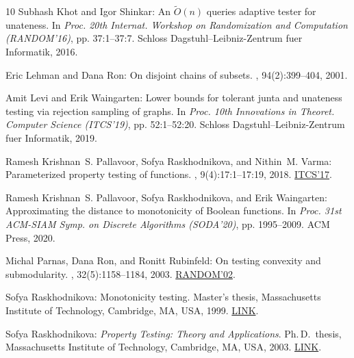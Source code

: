 \documentclass[11pt]{article}
\numberwithin{equation}{section}
\theoremstyle{definition}
\theoremstyle{plain}
\begin{document}
\begin{thebibliography}{10}
{\sc Subhash Khot and Igor Shinkar}: An $\widetilde{O}(n)$ queries adaptive
  tester for unateness.
\newblock In {\em Proc. 20th Internat. Workshop on Randomization and
  Computation (RANDOM'16)}, pp. 37:1--37:7. Schloss Dagstuhl--Leibniz-Zentrum
  fuer Informatik, 2016.

{\sc Eric Lehman and Dana Ron}: On disjoint chains of subsets.
, 94(2):399--404, 2001.

{\sc Amit Levi and Erik Waingarten}: Lower bounds for tolerant junta and
  unateness testing via rejection sampling of graphs.
\newblock In {\em Proc. 10th Innovations in Theoret. Computer Science
  (ITCS'19)}, pp. 52:1--52:20. Schloss Dagstuhl--Leibniz-Zentrum fuer
  Informatik, 2019.

{\sc Ramesh Krishnan~S. Pallavoor, Sofya Raskhodnikova, and Nithin~M. Varma}:
  Parameterized property testing of functions.
, 9(4):17:1--17:19, 2018.
\newblock \prelim \href{https://doi.org/10.4230/LIPIcs.ITCS.2017.12}{ITCS'17}.
\newblock [\epfmtdoi{10.1145/3155296}]

{\sc Ramesh Krishnan~S. Pallavoor, Sofya Raskhodnikova, and Erik Waingarten}:
  Approximating the distance to monotonicity of {Boolean} functions.
\newblock In {\em Proc. 31st ACM-SIAM Symp. on Discrete Algorithms (SODA'20)},
  pp. 1995--2009. ACM Press, 2020.

{\sc Michal Parnas, Dana Ron, and Ronitt Rubinfeld}: On testing convexity and
  submodularity.
, 32(5):1158--1184, 2003.
\newblock \prelim \href{https://doi.org/10.1007/3-540-45726-7\_2}{RANDOM'02}.
\newblock [\epfmtdoi{10.1137/S0097539702414026}]

{\sc Sofya Raskhodnikova}: Monotonicity testing.
\newblock Master's thesis, Massachusetts Institute of Technology, Cambridge,
  MA, {USA}, 1999.
\newblock \href{https://dspace.mit.edu/handle/1721.1/80562}{LINK}.

{\sc Sofya Raskhodnikova}: {\em Property Testing: Theory and Applications}.
\newblock Ph.\,D.\ thesis, Massachusetts Institute of Technology, Cambridge,
  MA, {USA}, 2003.
\newblock \href{http://hdl.handle.net/1721.1/28274}{LINK}.


\end{thebibliography}
\end{document}

